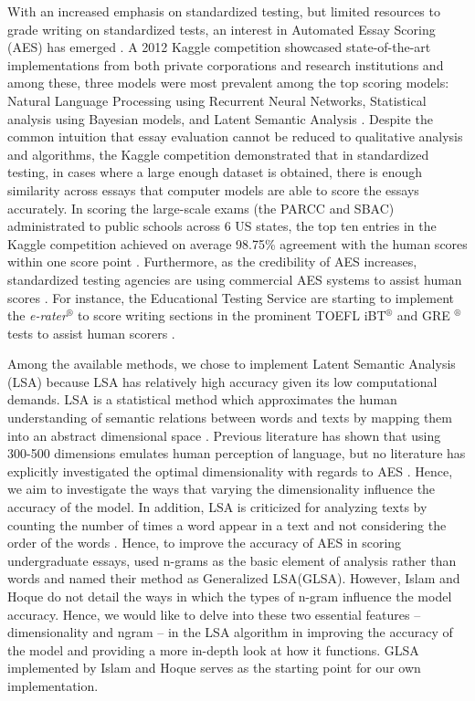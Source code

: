 \documentclass[10pt,letterpaper]{article}
\begin{document}
With an increased emphasis on standardized testing, but limited resources to grade writing on standardized tests, an interest in Automated Essay Scoring (AES) has emerged \cite{shermis2014state}. A 2012 Kaggle competition showcased state-of-the-art implementations from both private corporations and research institutions and among these, three models were most prevalent among the top scoring models: Natural Language Processing using Recurrent Neural Networks, Statistical analysis using Bayesian models, and Latent Semantic Analysis \cite{shermis2014state}. Despite the common intuition that essay evaluation cannot be reduced to qualitative analysis and algorithms, the Kaggle competition demonstrated that in standardized testing, in cases where a large enough dataset is obtained, there is enough similarity across essays that computer models are able to score the essays accurately. In scoring the large-scale exams (the PARCC and SBAC) administrated to public schools across 6 US states, the top ten entries in the Kaggle competition achieved on average 98.75\% agreement with the human scores within one score point \cite{shermis2014state}. Furthermore, as the credibility of AES increases, standardized testing agencies are using commercial AES systems to assist human scores \cite{shermis2014state}. For instance, the Educational Testing Service are starting to implement the \textit{e-rater}$^{\circledR}$ to score writing sections in the prominent TOEFL iBT$^{\circledR}$ and GRE $^{\circledR}$ tests to assist human scorers \cite{ets2019aes}.

Among the available methods, we chose to implement Latent Semantic Analysis (LSA) because LSA has relatively high accuracy given its low computational demands. LSA is a statistical method which approximates the human understanding of semantic relations between words and texts by mapping them into an abstract dimensional space \cite{kintsch2002potential}. Previous literature has shown that using 300-500 dimensions emulates human perception of language, but no literature has explicitly investigated the optimal dimensionality with regards to AES \cite{kintsch2002potential}. Hence, we aim to  investigate the ways that varying the dimensionality influence the accuracy of the model. In addition, LSA is criticized for analyzing texts by counting the number of times a word appear in a text and not considering the order of the words \cite{kintsch2002potential}. Hence, to improve the accuracy of AES in scoring undergraduate essays,  used n-grams as the basic element of analysis rather than words and named their method as Generalized LSA(GLSA). However, Islam and Hoque do not detail the ways in which the types of n-gram influence the model accuracy. Hence, we would like to delve into these two essential features -- dimensionality and ngram -- in the LSA algorithm in improving the accuracy of the model and providing a more in-depth look at how it functions. GLSA implemented by Islam and Hoque serves as the starting point for our own implementation. 
\end{document}
